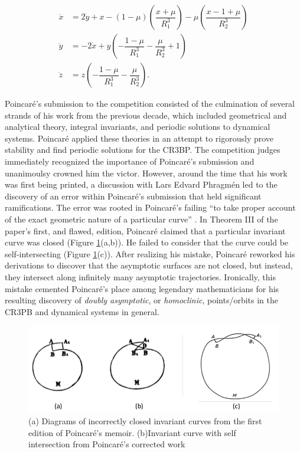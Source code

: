 \documentclass[11pt]{article} %
\begin{document}
\begin{align}
\ddot{x} &=  2\dot{y} + x - (1-\mu)\left(\dfrac{x+\mu}{R_1^3}\right) - \mu\left(\dfrac{x-1+\mu}{R_2^3}\right) \label{eomx}\\
\ddot{y} &= - 2\dot{x} + y\left(-\dfrac{1-\mu}{R_1^3} - \dfrac{\mu}{R_2^3} + 1\right) \label{eomy}\\
\ddot{z} &= z\left(-\dfrac{1 - \mu}{R_1^3} - \dfrac{\mu}{R_2^3}\right). \label{eomz}
\end{align}

Poincaré's submission to the competition consisted of the culmination of several strands of his work from the previous decade, which included geometrical and analytical theory, integral invariants, and periodic solutions to dynamical systems. Poincaré applied these theories in an attempt to rigorously prove stability and find periodic solutions for the CR3BP. The competition judges immediately recognized the importance of Poincaré's submission and unanimoulsy crowned him the victor. However, around the time that his work was first being printed, a discussion with Lars Edvard Phragmén led to the discovery of an error within Poincaré's submission that held significant ramifications. The error was rooted in Poincaré's failing ``to take proper account of the exact geometric nature of a particular curve'' \cite{BarrowGreen1997}. In Theorem III of the paper's first, and flawed, edition, Poincaré claimed that a particular invariant curve was closed (Figure \ref{fig:curveIntersection1}(a,b)). He failed to consider that the curve could be self-intersecting (Figure \ref{fig:curveIntersection1}(c)). After realizing his mistake, Poincaré reworked his derivations to discover that the asymptotic surfaces are not closed, but instead, they intersect along infinitely many asymptotic trajectories. Ironically, this mistake cemented Poincaré's place among legendary mathematicians for his resulting discovery of \textit{doubly asymptotic}, or \textit{homoclinic}, points/orbits in the CR3PB and dynamical systems in general.  

\begin{figure}[H]
\centering
\includegraphics[width=5in]{curveIntersection1.png}\nonumber
\caption{(a) Diagrams of incorrectly closed invariant curves from the first edition of Poincaré's memoir. (b)Invariant curve with self intersection from Poincaré's corrected work \cite{BarrowGreen1997}}
\label{fig:curveIntersection1}
\end{figure}
\end{document}
